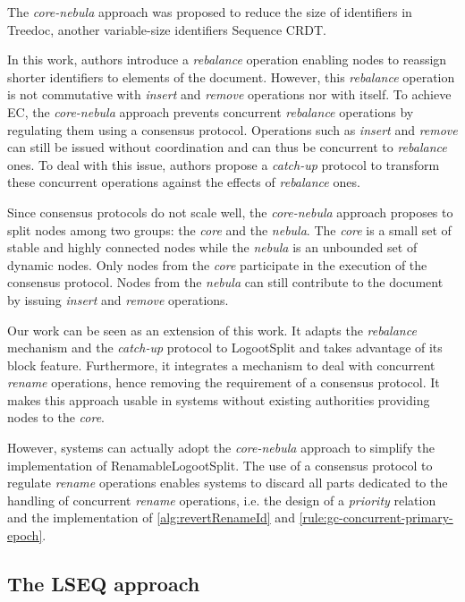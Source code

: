 \documentclass[10pt,journal,compsoc]{IEEEtran}
\newcommand{\ie}{i.e. }
\begin{document}
The \emph{core-nebula} approach \cite{letia:hal-01248270, zawirski:hal-01248197} was proposed to reduce the size of identifiers in Treedoc\cite{5158449}, another variable-size identifiers Sequence \ac{CRDT}.

In this work, authors introduce a \emph{rebalance} operation enabling nodes to reassign shorter identifiers to elements of the document.
However, this \emph{rebalance} operation is not commutative with \emph{insert} and \emph{remove} operations nor with itself.
To achieve \ac{EC}\cite{10.1145/224057.224070}, the \emph{core-nebula} approach prevents concurrent \emph{rebalance} operations by regulating them using a consensus protocol.
Operations such as \emph{insert} and \emph{remove} can still be issued without coordination and can thus be concurrent to \emph{rebalance} ones.
To deal with this issue, authors propose a \emph{catch-up} protocol to transform these concurrent operations against the effects of \emph{rebalance} ones.

Since consensus protocols do not scale well, the \emph{core-nebula} approach proposes to split nodes among two groups: the \emph{core} and the \emph{nebula}.
The \emph{core} is a small set of stable and highly connected nodes while the \emph{nebula} is an unbounded set of dynamic nodes.
Only nodes from the \emph{core} participate in the execution of the consensus protocol.
Nodes from the \emph{nebula} can still contribute to the document by issuing \emph{insert} and \emph{remove} operations.

Our work can be seen as an extension of this work.
It adapts the \emph{rebalance} mechanism and the \emph{catch-up} protocol to LogootSplit and takes advantage of its block feature.
Furthermore, it integrates a mechanism to deal with concurrent \emph{rename} operations, hence removing the requirement of a consensus protocol.
It makes this approach usable in systems without existing authorities providing nodes to the \emph{core}.

However, systems can actually adopt the \emph{core-nebula} approach to simplify the implementation of RenamableLogootSplit.
The use of a consensus protocol to regulate \emph{rename} operations enables systems to discard all parts dedicated to the handling of concurrent \emph{rename} operations, \ie the design of a \emph{priority} relation and the implementation of \autoref{alg:revertRenameId} and \autoref{rule:gc-concurrent-primary-epoch}.

\subsection{The LSEQ approach}
\end{document}
